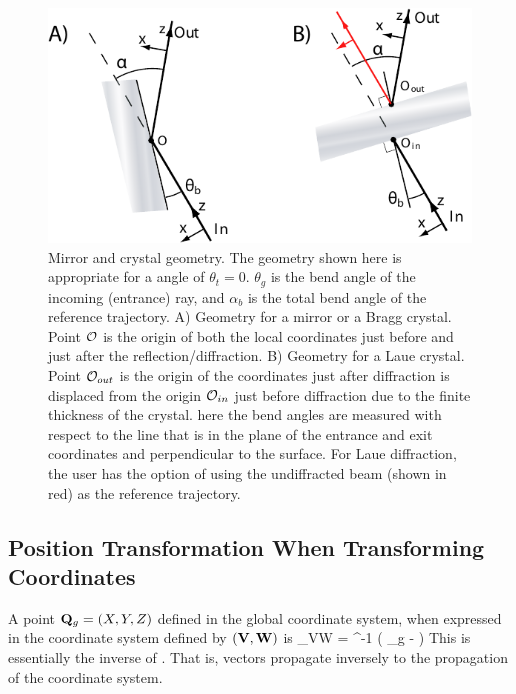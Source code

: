 \begin{figure}
  \centering \includegraphics{mirror.pdf} 
\caption[Mirror and crystal geometry] {Mirror and crystal geometry.
The geometry shown here is appropriate for a  angle of
$\theta_t = 0$.  $\theta_g$ is the bend angle of the incoming
(entrance) ray, and $\alpha_b$ is the total bend
angle of the reference trajectory. A) Geometry for a mirror or a Bragg
crystal. Point ${\cal O}$ is the origin of both the local coordinates
just before and just after the reflection/diffraction. B) Geometry for
a Laue crystal.  Point ${\cal O}_{out}$ is the origin of the coordinates
just after diffraction is displaced from the origin ${\cal O}_{in}$ just
before diffraction due to the finite thickness of the crystal. here
the bend angles are measured with respect to the line that is in
the plane of the entrance and exit coordinates and perpendicular to
the surface. For Laue diffraction, the user has the option of using
the undiffracted beam (shown in red) as the reference trajectory.
  }  
  \label{f:mirror}
\end{figure}

\subsection{Position Transformation When Transforming Coordinates}
\label{s:pos.trans}

A point ${\bf Q}_g = (X, Y, Z)$ defined in the global coordinate system,
when expressed in the coordinate system defined by $({\bf V}, {\bf W})$ is
\Begineq
  \bfQ_{VW} = \bfW^{-1} \left( \bfQ_g - \bfV \right)
  \label{rwrv}
\Endeq
This is essentially the inverse of . That is, vectors
propagate inversely to the propagation of the coordinate system.

